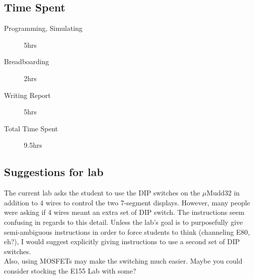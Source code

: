 \documentclass[11pt]{article}
\begin{document}
\subsection{Time Spent}

\begin{description}
	\item[Programming, Simulating] 5hrs
	\item[Breadboarding] 2hrs
	\item[Writing Report] 5hrs
	\item[Total Time Spent] 9.5hrs
\end{description}

\subsection{Suggestions for lab}

The current lab asks the student to use the DIP switches on the $\mu$Mudd32 in addition to 4 wires to control the two 7-segment displays. However, many people were asking if 4 wires meant an extra set of DIP switch. The instructions seem confusing in regards to this detail. Unless the lab's goal is to purposefully give semi-ambiguous instructions in order to force students to think (channeling E80, eh?), I would suggest explicitly giving instructions to use a second set of DIP switches. \\

Also, using MOSFETs may make the switching much easier. Maybe you could consider stocking the E155 Lab with some?
\end{document}
